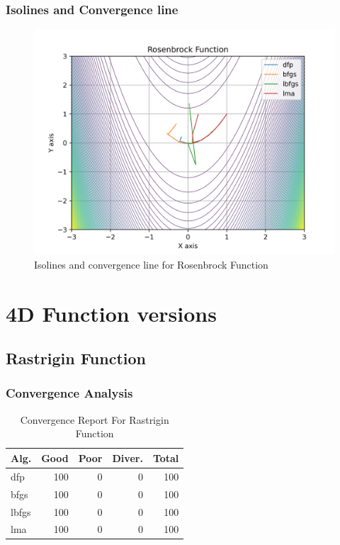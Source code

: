\documentclass[conference]{IEEEtran}
\begin{document}
\subsubsection{Isolines and Convergence line}
\label{isolinesrosenbrock2d2D}

\begin{figure}[H]
\centering
\caption{Isolines and convergence line for Rosenbrock Function}
\label{fig:rosenbrock2d}
\includegraphics[scale=0.5]{images/rosenbrock2d.jpg}
\end{figure}

\section{4D Function versions}
\label{functions4D}

\subsection{Rastrigin Function}
\label{rastrigin4d4D}

\subsubsection{Convergence Analysis}
\label{convergencerastrigin4d4D}

\begin{table}[H]
\centering
\caption{Convergence Report For Rastrigin Function}
\label{convergence:rastrigin4d}
\begin{tabular}{lrrrr}
\toprule
 Alg. &  Good &  Poor &  Diver. &  Total \\
\midrule
  dfp &   100 &     0 &       0 &    100 \\
 bfgs &   100 &     0 &       0 &    100 \\
lbfgs &   100 &     0 &       0 &    100 \\
  lma &   100 &     0 &       0 &    100 \\
\bottomrule
\end{tabular}
\end{table}
\end{document}
